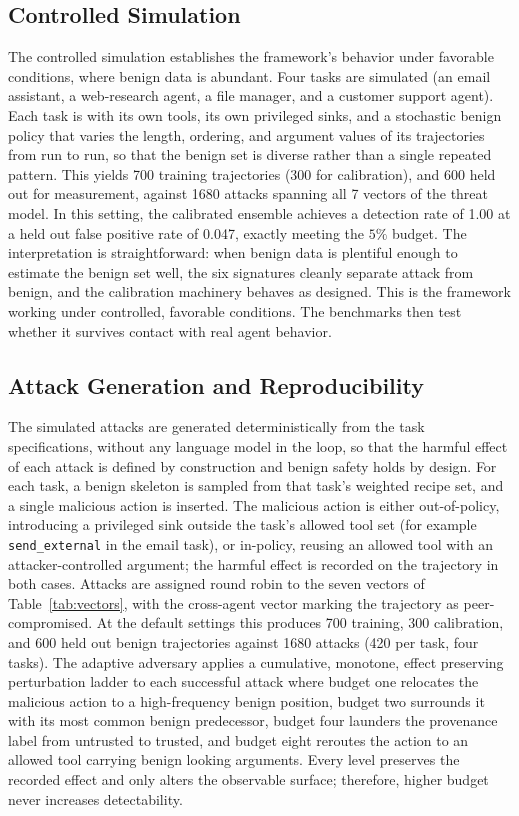 \documentclass[journal]{IEEEtran}
\theoremstyle{remark}
\begin{document}
\subsection{Controlled Simulation}
The controlled simulation establishes the framework's behavior under favorable conditions, where benign data is abundant. Four tasks are simulated (an email assistant, a web-research agent, a file manager, and a customer support agent). Each task is with its own tools, its own privileged sinks, and a stochastic benign policy that varies the length, ordering, and argument values of its trajectories from run to run, so that the benign set is diverse rather than a single repeated pattern. This yields 700 training trajectories (300 for calibration), and 600 held out for measurement, against 1680 attacks spanning all 7 vectors of the threat model. In this setting, the calibrated ensemble achieves a detection rate of 1.00 at a held out false positive rate of 0.047, exactly meeting the \(5\%\) budget. The interpretation is straightforward: when benign data is plentiful enough to estimate the benign set well, the six signatures cleanly separate attack from benign, and the calibration machinery behaves as designed. This is the framework working under controlled, favorable conditions. The benchmarks then test whether it survives contact with real agent behavior.

\subsection{Attack Generation and Reproducibility}
The simulated attacks are generated deterministically from the task specifications, without any language model in the loop, so that the harmful effect of each attack is defined by construction and benign safety holds by design. For each task, a benign skeleton is sampled from that task's weighted recipe set, and a single malicious action is inserted. The malicious action is either out-of-policy, introducing a privileged sink outside the task's allowed tool set (for example \texttt{send\_external} in the email task), or in-policy, reusing an allowed tool with an attacker-controlled argument; the harmful effect is recorded on the trajectory in both cases. Attacks are assigned round robin to the seven vectors of Table~\ref{tab:vectors}, with the cross-agent vector marking the trajectory as peer-compromised. At the default settings this produces 700 training, 300 calibration, and 600 held out benign trajectories against 1680 attacks (420 per task, four tasks). The adaptive adversary applies a cumulative, monotone, effect preserving perturbation ladder to each successful attack where budget one relocates the malicious action to a high-frequency benign position, budget two surrounds it with its most common benign predecessor, budget four launders the provenance label from untrusted to trusted, and budget eight reroutes the action to an allowed tool carrying benign looking arguments. Every level preserves the recorded effect and only alters the observable surface; therefore, higher budget never increases detectability.
\end{document}

